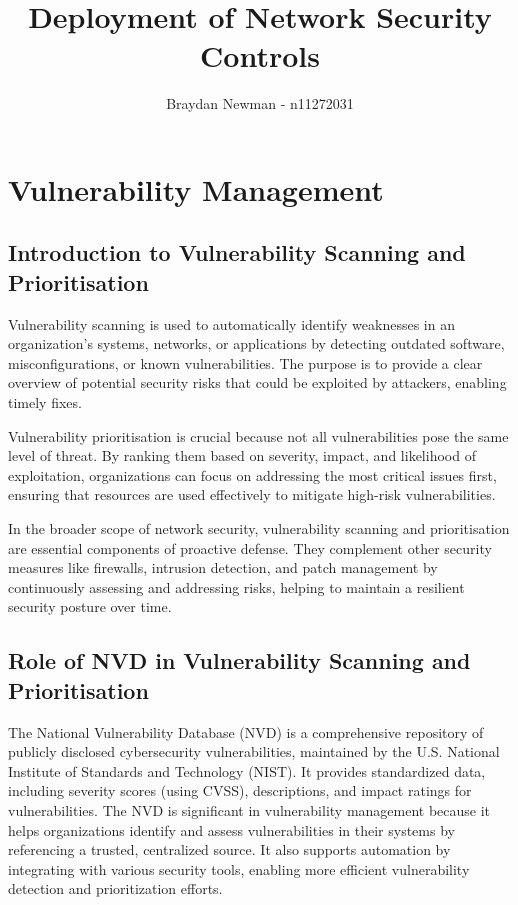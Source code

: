 \documentclass[12pt,a4paper]{report}
\author{Braydan Newman - n11272031}
\title{Deployment of Network Security Controls}
\begin{document}
\maketitle
\tableofcontents

\newpage

\section{Vulnerability Management}
\subsection{Introduction to Vulnerability Scanning and Prioritisation}
Vulnerability scanning is used to automatically identify weaknesses in an organization's systems, networks, or applications by detecting outdated software, misconfigurations, or known vulnerabilities. The purpose is to provide a clear overview of potential security risks that could be exploited by attackers, enabling timely fixes.

Vulnerability prioritisation is crucial because not all vulnerabilities pose the same level of threat. By ranking them based on severity, impact, and likelihood of exploitation, organizations can focus on addressing the most critical issues first, ensuring that resources are used effectively to mitigate high-risk vulnerabilities.

In the broader scope of network security, vulnerability scanning and prioritisation are essential components of proactive defense. They complement other security measures like firewalls, intrusion detection, and patch management by continuously assessing and addressing risks, helping to maintain a resilient security posture over time.

\subsection{Role of NVD in Vulnerability Scanning and Prioritisation}
The National Vulnerability Database (NVD) is a comprehensive repository of publicly disclosed cybersecurity vulnerabilities, maintained by the U.S. National Institute of Standards and Technology (NIST). It provides standardized data, including severity scores (using CVSS), descriptions, and impact ratings for vulnerabilities. The NVD is significant in vulnerability management because it helps organizations identify and assess vulnerabilities in their systems by referencing a trusted, centralized source. It also supports automation by integrating with various security tools, enabling more efficient vulnerability detection and prioritization efforts.
\end{document}
